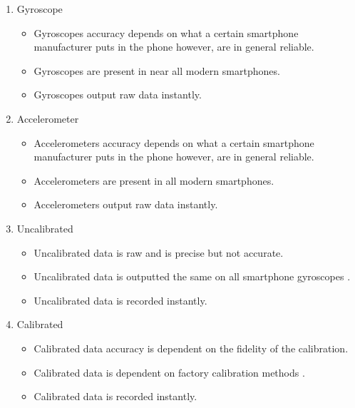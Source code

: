 \documentclass[onecolumn, draftclsnofoot,10pt, journal, letterpaper]{IEEEtran}
\begin{document}
        \begin{enumerate}
            \item Gyroscope
            \begin{itemize}
                \item Gyroscopes accuracy depends on what a certain smartphone manufacturer puts in the phone however, are in general reliable.
                \item Gyroscopes are present in near all modern smartphones.
                \item Gyroscopes output raw data instantly.
            \end{itemize}
            \item Accelerometer
            \begin{itemize}
                \item Accelerometers accuracy depends on what a certain smartphone manufacturer puts in the phone however, are in general reliable.
                \item Accelerometers are present in all modern smartphones.
                \item Accelerometers output raw data instantly.
            \end{itemize}
            \item Uncalibrated
            \begin{itemize}
                \item Uncalibrated data is raw and is precise but not accurate.
                \item Uncalibrated data is outputted the same on all smartphone gyroscopes \cite{Android}.
                \item Uncalibrated data is recorded instantly.
            \end{itemize}
            \item Calibrated
            \begin{itemize}
                \item Calibrated data accuracy is dependent on the fidelity of the calibration.
                \item Calibrated data is dependent on factory calibration methods \cite{Android}.
                \item Calibrated data is  recorded instantly.
            \end{itemize}
        \end{enumerate}
        
\end{document}
